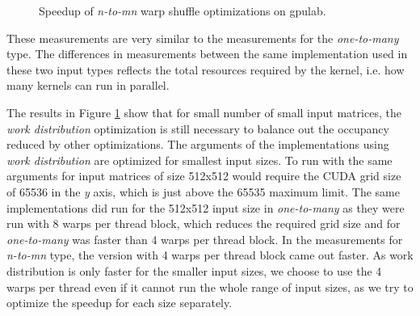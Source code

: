 \begin{figure}[ht]
	\centering	
	\begin{subfigure}{0.4\textwidth}
		\centering
		\def\svgwidth{\textwidth}
		
	\end{subfigure}
	\begin{subfigure}{0.4\textwidth}
		\centering
		\def\svgwidth{\textwidth}
		
	\end{subfigure}
	\hfill
	\begin{subfigure}{0.4\textwidth}
		\centering
		\def\svgwidth{\textwidth}
		
	\end{subfigure}
	
	\caption{Speedup of \textit{n-to-mn} warp shuffle optimizations on gpulab.}
	\label{fig:warp_shuffle_n_to_mn_results}
\end{figure}

These measurements are very similar to the measurements for the \textit{one-to-many} type. The differences in measurements between the same implementation used in these two input types reflects the total resources required by the kernel, i.e. how many kernels can run in parallel.


The results in Figure \ref{fig:warp_shuffle_n_to_mn_results} show that for small number of small input matrices, the \textit{work distribution} optimization is still necessary to balance out the occupancy reduced by other optimizations. The arguments of the implementations using \textit{work distribution} are optimized for smallest input sizes. To run with the same arguments for input matrices of size 512x512 would require the CUDA grid size of 65536 in the \textit{y} axis, which is just above the 65535 maximum limit. The same implementations did run for the 512x512 input size in \textit{one-to-many} as they were run with 8 warps per thread block, which reduces the required grid size and for \textit{one-to-many} was faster than 4 warps per thread block. In the measurements for \textit{n-to-mn} type, the version with 4 warps per thread block came out faster. 
As work distribution is only faster for the smaller input sizes, we choose to use the 4 warps per thread even if it cannot run the whole range of input sizes, as we try to optimize the speedup for each size separately.

